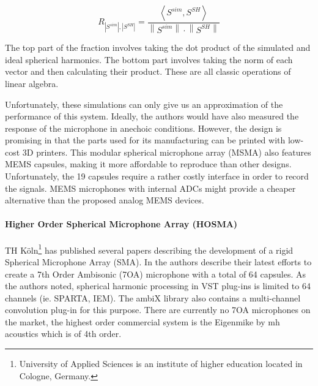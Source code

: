 \begin{equation}
R_{\left|S^{s i m}\right|,\left|S^{S H}\right|}=\frac{\left\langle S^{s i m}, S^{S H}\right\rangle}{\left\|S^{s i m}\right\| \cdot\left\|S^{S H}\right\|}
\end{equation}

The top part of the fraction involves taking the dot product of the simulated and ideal spherical harmonics. The bottom part involves taking the norm of each vector and then calculating their product. These are all classic operations of linear algebra. 

Unfortunately, these simulations can only give us an approximation of the performance of this system. Ideally, the authors would have also measured the response of the microphone in anechoic conditions. However, the design is promising in that the parts used for its manufacturing can be printed with low-cost 3D printers. This modular spherical microphone array (MSMA) also features MEMS capsules, making it more affordable to reproduce than other designs. Unfortunately, the 19 capsules require a rather costly interface in order to record the signals. MEMS microphones with internal ADCs might provide a cheaper alternative than the proposed analog MEMS devices. 

\paragraph{Higher Order Spherical Microphone Array (HOSMA)}

TH Köln\footnote{University of Applied Sciences is an institute of higher education located in Cologne, Germany.} has published several papers describing the development of a rigid Spherical Microphone Array (SMA). In \cite{moschner2020development} the authors describe their latest efforts to create a 7th Order Ambisonic (7OA) microphone with a total of 64 capsules. As the authors noted, spherical harmonic processing in VST plug-ins is limited to 64 channels (ie. SPARTA, IEM). The ambiX library also contains a multi-channel convolution plug-in for this purpose. There are currently no 7OA microphones on the market, the highest order commercial system is the Eigenmike by mh acoustics which is of 4th order.

